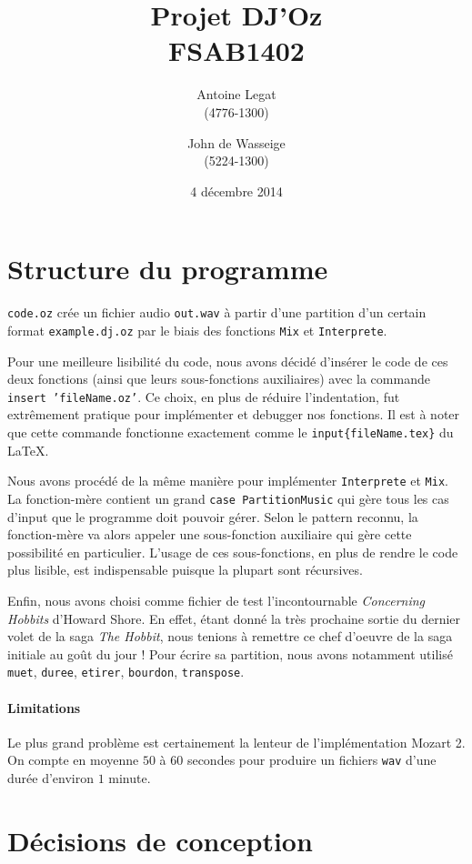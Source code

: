 \documentclass[a4paper,oneside,10pt]{article}
\title{Projet DJ'Oz \\ \small{FSAB1402}}
\author{Antoine Legat \\(4776-1300) \and John de Wasseige \\(5224-1300)}
\date{4 décembre 2014}
\newcommand{\fun}[1]{\texttt{#1}}
\newcommand{\bslash}{\texttt{\symbol{92}}}
\begin{document}
\maketitle

\section{Structure du programme}
\fun{code.oz} crée un fichier audio \fun{out.wav} à partir d'une partition d'un certain format \fun{example.dj.oz} par le biais des fonctions \fun{Mix} et \fun{Interprete}.

Pour une meilleure lisibilité du code, nous avons décidé d'insérer le code de ces deux fonctions (ainsi que leurs sous-fonctions auxiliaires) avec la commande \fun{\bslash insert 'fileName.oz'}. Ce choix, en plus de réduire l'indentation, fut extrêmement pratique pour implémenter et debugger nos fonctions. Il est à noter que cette commande fonctionne exactement comme le \fun{\bslash input\{fileName.tex\}} du \LaTeX.

Nous avons procédé de la même manière pour implémenter \fun{Interprete} et \fun{Mix}. La fonction-mère contient un grand \fun{case Partition\bslash Music} qui gère tous les cas d'input que le programme doit pouvoir gérer. Selon le pattern reconnu, la fonction-mère va alors appeler une sous-fonction auxiliaire qui gère cette possibilité en particulier. L'usage de ces sous-fonctions, en plus de rendre le code plus lisible, est indispensable puisque la plupart sont récursives.

Enfin, nous avons choisi comme fichier de test l'incontournable \textit{Concerning Hobbits} d'Howard Shore. En effet, étant donné la très prochaine sortie du dernier volet de la saga \textit{The Hobbit}, nous tenions à remettre ce chef d'oeuvre de la saga initiale au goût du jour ! Pour écrire sa partition, nous avons notamment utilisé \fun{muet}, \fun{duree}, \fun{etirer}, \fun{bourdon}, \fun{transpose}.

\paragraph{Limitations}
Le plus grand problème est certainement la lenteur de l'implémentation Mozart 2. 
On compte en moyenne $50$ à $60$ secondes pour produire un fichiers \fun{wav} d'une 
durée d'environ $1$ minute.

\section{Décisions de conception}
\end{document}
